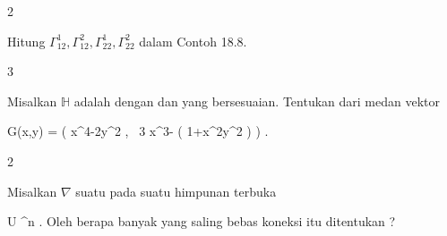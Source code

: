 {2}
{

Hitung $\Gamma^1_{12},  \Gamma^2_{12},  \Gamma^1_{22},  \Gamma^2_{22}$ dalam
Contoh 18.8.

}
{} {}

{3}
{

Misalkan ${\mathbb H}$ adalah
dengan
dan
yang bersesuaian. Tentukan
 dari medan vektor

\mavergleichskettedisp
{\vergleichskette
{ G(x,y)
}
{ =} { \left(  x^4-2y^2  , \,   3 x^3-  \ln  \left(  1+x^2y^2 \right)                   \right)
}
{ } {
}
{ } {
}
{ } {
}
}
{}{}{.}

}
{} {}

{2}
{

Misalkan $\nabla$ suatu
pada suatu himpunan terbuka

\mavergleichskette
{\vergleichskette
{ U
}
{ \subseteq }{ \R^n
}
{  }{
}
{    }{
}
{   }{
}
}
{}{}{.}
Oleh berapa banyak
yang saling bebas koneksi itu ditentukan
 {} {}?

}
{} {}
